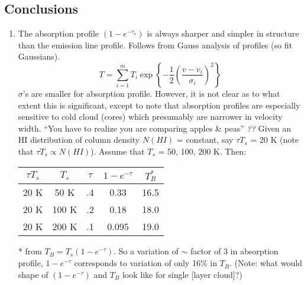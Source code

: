 \documentclass[11pt]{article}
\newcommand{\mar}[1]{\hspace{0pt}\marginpar{-\textcolor{black}{#1}-}}
\newcommand{\mynotes}[1]{{\fontfamily{cmss}\selectfont \textit{#1}}}
\begin{document}
\subsection{Conclusions}
\mar{45}
\begin{enumerate}
    \item The absorption profile $(1 - {e}^{-\tau_{\nu}})$ is always
        sharper and simpler in structure than the emission line profile.
        Follows from Gauss analysis of profiles (so fit Gaussians).
        \[
            T = \sum_{i=1}^{m}{
                T_{i} \exp \left\{ -\frac{1}{2} \left(
                    \frac{v - v_{i}}{\sigma_{i}} \right)^{2}
                \right\}}
            \]
        $\sigma$'s are smaller for absorption profile. However, it is not
        clear as to what extent this is significant, except to note that
        absorption profiles are especially sensitive to cold cloud (cores)
        which presumably are narrower in velocity width.
        ``You have to realize you are comparing apples \& peas'' \mynotes{??}
        Given an HI distribution of column density $N(HI)$ = constant, say
        $\tau T_{s}$ = 20 K (note that $\tau T_{s} \propto N(HI)$).
        Assume that $T_{s}$ = 50, 100, 200 K. Then:
        \begin{center}
            \begin{tabular}{c c c c c}
                $\tau T_{s}$ & $T_{s}$ & $\tau$ & $1-e^{-\tau}$ & $T_{B}^{*}$\\
                \hline
                20 K & 50 K & .4 & 0.33 & 16.5\\
                20 K & 100 K & .2 & 0.18 & 18.0\\
                20 K & 200 K & .1 & 0.095 & 19.0\\
            \end{tabular}
        \end{center}
        * from $T_{B} = T_{s} (1-e^{-\tau})$. So a variation of $\sim$
        factor of 3 in absorption profile, $1-e^{-\tau}$ corresponds to
        variation of only 16\% in $T_{B}$. (Note: what would shape of
        $(1-e^{-\tau})$ and $T_{B}$ look like for single [layer cloud]?)


\end{enumerate}
\end{document}
